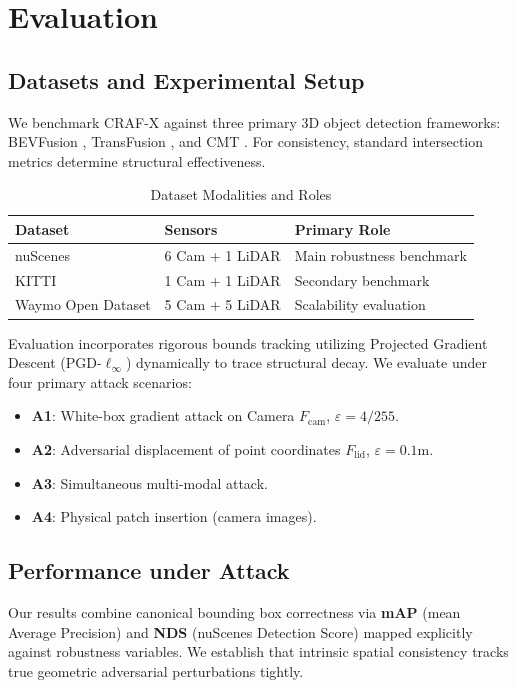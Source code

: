 \section{Evaluation}
\label{sec:evaluation}

\subsection{Datasets and Experimental Setup}
We benchmark CRAF-X against three primary 3D object detection frameworks: BEVFusion \cite{LiuBEVFusion2023}, TransFusion \cite{BaiTransFusion2022}, and CMT \cite{YanCMT2023}. For consistency, standard intersection metrics determine structural effectiveness.

\begin{table}[h]
\centering
\caption{Dataset Modalities and Roles}
\begin{tabular}{llp{5cm}}
\toprule
\textbf{Dataset} & \textbf{Sensors} & \textbf{Primary Role} \\
\midrule
nuScenes & 6 Cam + 1 LiDAR & Main robustness benchmark \\
KITTI & 1 Cam + 1 LiDAR & Secondary benchmark \\
Waymo Open Dataset & 5 Cam + 5 LiDAR & Scalability evaluation \\
\bottomrule
\end{tabular}
\end{table}

Evaluation incorporates rigorous bounds tracking utilizing Projected Gradient Descent (PGD-$\ell_\infty$) dynamically to trace structural decay. We evaluate under four primary attack scenarios:
\begin{itemize}
    \item \textbf{A1}: White-box gradient attack on Camera $F_{\text{cam}}$, $\varepsilon=4/255$.
    \item \textbf{A2}: Adversarial displacement of point coordinates $F_{\text{lid}}$, $\varepsilon=0.1$m.
    \item \textbf{A3}: Simultaneous multi-modal attack.
    \item \textbf{A4}: Physical patch insertion (camera images).
\end{itemize}

\subsection{Performance under Attack}
Our results combine canonical bounding box correctness via \textbf{mAP} (mean Average Precision) and \textbf{NDS} (nuScenes Detection Score) mapped explicitly against robustness variables. We establish that intrinsic spatial consistency tracks true geometric adversarial perturbations tightly.

